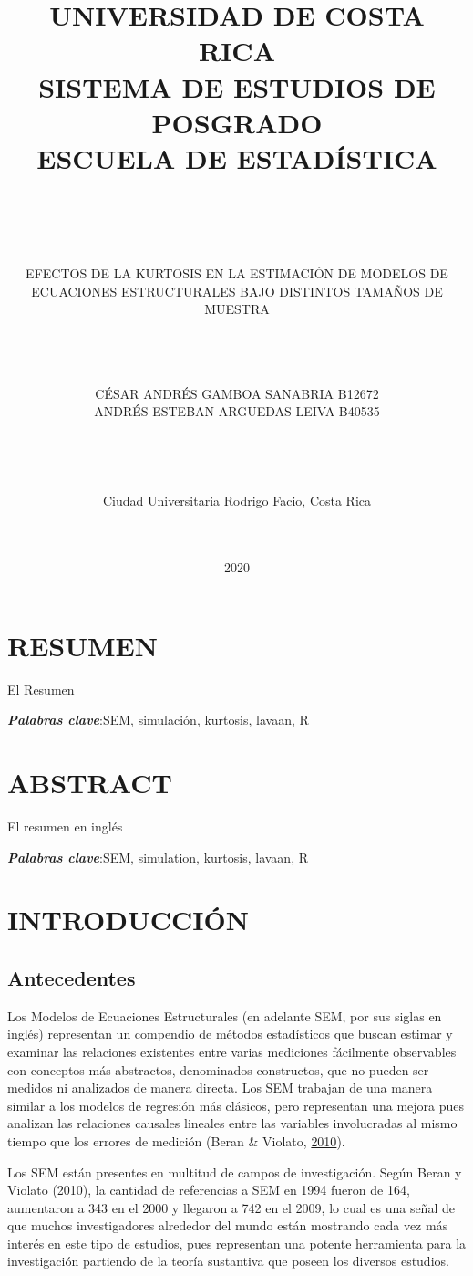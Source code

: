 \documentclass[
]{article}
\title{UNIVERSIDAD DE COSTA RICA\\
SISTEMA DE ESTUDIOS DE POSGRADO\\
ESCUELA DE ESTADÍSTICA\\
~\\
~\\}
\subtitle{EFECTOS DE LA KURTOSIS EN LA ESTIMACIÓN DE MODELOS DE
ECUACIONES ESTRUCTURALES BAJO DISTINTOS TAMAÑOS DE MUESTRA\\
~\\
~\\
~\\}
\author{\hfill\break
\hfill\break
\hfill\break
\hfill\break
\hfill\break
CÉSAR ANDRÉS GAMBOA SANABRIA B12672\\
ANDRÉS ESTEBAN ARGUEDAS LEIVA B40535\\
~\\
~\\
~\\
~\\
Ciudad Universitaria Rodrigo Facio, Costa Rica\\
~\\
~\\}
\date{2020}
\begin{document}
\maketitle

\cleardoublepage

\newpage

\section*{RESUMEN}

El Resumen

\textbf{\emph{Palabras clave}}:SEM, simulación, kurtosis, lavaan, R
\cleardoublepage

\section*{ABSTRACT}

El resumen en inglés

\textbf{\emph{Palabras clave}}:SEM, simulation, kurtosis, lavaan, R
\cleardoublepage

\newpage

\tableofcontents
\cleardoublepage
{}

\newpage

\section{INTRODUCCIÓN}

\subsection{Antecedentes}

Los Modelos de Ecuaciones Estructurales (en adelante SEM, por sus siglas
en inglés) representan un compendio de métodos estadísticos que buscan
estimar y examinar las relaciones existentes entre varias mediciones
fácilmente observables con conceptos más abstractos, denominados
constructos, que no pueden ser medidos ni analizados de manera directa.
Los SEM trabajan de una manera similar a los modelos de regresión más
clásicos, pero representan una mejora pues analizan las relaciones
causales lineales entre las variables involucradas al mismo tiempo que
los errores de medición (Beran \& Violato,
\protect\hyperlink{ref-Beran2010StructuralEM}{2010}).

Los SEM están presentes en multitud de campos de investigación. Según
Beran y Violato (2010), la cantidad de referencias a SEM en 1994 fueron
de 164, aumentaron a 343 en el 2000 y llegaron a 742 en el 2009, lo cual
es una señal de que muchos investigadores alrededor del mundo están
mostrando cada vez más interés en este tipo de estudios, pues
representan una potente herramienta para la investigación partiendo de
la teoría sustantiva que poseen los diversos estudios.
\end{document}
